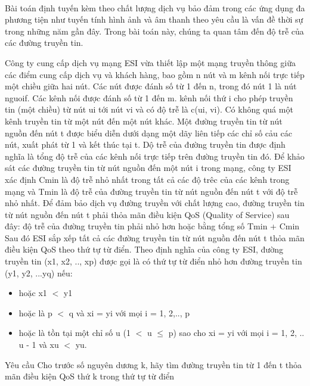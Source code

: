  

Bài toán định tuyến kèm theo chất lượng dịch vụ bảo đảm trong các ứng dụng đa phương tiện như tuyến tính hình ảnh và âm thanh theo yêu cầu là vấn đề thời sự trong những năm gần đây. Trong bài toán này, chúng ta quan tâm đến độ trễ của các đường truyền tin.

Công ty cung cấp dịch vụ mạng ESI vừa thiết lập một mạng truyền thông giữa các điểm cung cấp dịch vụ và khách hàng, bao gồm n nút và m kênh nối trực tiếp một chiều giữa hai nút. Các nút được đánh số từ 1 đến n, trong đó nút 1 là nút nguoif. Các kênh nối được đánh số từ 1 đến m. kênh nối thứ i cho phép truyền tin (một chiều) từ nút ui tới nút vi và có độ trễ là c(ui, vi). Có không quá một kênh truyền tin từ một nút đến một nút khác. Một đường truyền tin từ nút nguồn đến nút t được biểu diễn dưới dạng một dãy liên tiếp các chỉ số cảu các nút, xuất phát từ 1 và kết thúc tại t. Dộ trễ của đường truyền tin được định nghĩa là tổng độ trễ của các kênh nối trực tiếp trên đường truyền tin đó. Để khảo sát các đường truyền tin từ nút nguồn đến một nút i trong mạng, công ty ESI xác định Cmin là độ trễ nhỏ nhất trong tất cả các độ trêc của các kênh trong mạng và Tmin là độ trễ của đường truyền tin từ nút nguồn đến nút t với độ trễ nhỏ nhất. Để đảm bảo dịch vụ đường truyền với chất lượng cao, đường truyền tin từ nút nguồn đến nút t phải thỏa mãn điều kiện QoS (Quality of Service) sau đây: độ trễ của đường truyền tin phải nhỏ hơn hoặc bằng tổng số Tmin + Cmin Sau đó ESI sắp xếp tất cả các đường truyền tin từ nút nguồn đến nút t thỏa mãn điều kiện QoS theo thứ tự từ điển. Theo định nghĩa của công ty ESI, đường truyền tin (x1, x2, .., xp) được gọi là có thứ tự từ điển nhỏ hơn đường truyền tin (y1, y2, ...yq) nếu:
\begin{itemize}
	\item hoặc x1 $<$ y1
	\item hoặc là p $<$ q và xi = yi với mọi i = 1, 2,.., p
	\item hoặc là tồn tại một chỉ số u (1 $<$ u  $\le$  p) sao cho xi = yi với mọi i = 1, 2, .. u - 1 và xu $<$ yu.
\end{itemize}
Yêu cầu
Cho trước số nguyên dương k, hãy tìm đường truyền tin từ 1 đến t thỏa mãn điều kiện QoS thứ k trong thứ tự từ điển